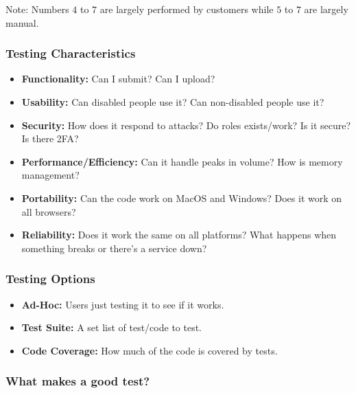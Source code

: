 \begin{note}
	Note: Numbers \(4\) to \(7\) are largely performed by customers while \(5\) to \(7\) are largely manual.
\end{note}

\subsubsection{Testing Characteristics}\label{ssub:testing_characteristics}

\begin{itemize}
	\item \textbf{Functionality:} Can I submit? Can I upload?
	\item \textbf{Usability:} Can disabled people use it? Can non-disabled people use it?
	\item \textbf{Security:} How does it respond to attacks? Do roles exists/work? Is it secure? Is there 2FA?
	\item \textbf{Performance/Efficiency:} Can it handle peaks in volume? How is memory management?
	\item \textbf{Portability:} Can the code work on MacOS and Windows? Does it work on all browsers?
	\item \textbf{Reliability:} Does it work the same on all platforms? What happens when something breaks or there's a service down?
\end{itemize}

\subsubsection{Testing Options}\label{ssub:testing_options}

\begin{itemize}
	\item \textbf{Ad-Hoc:} Users just testing it to see if it works.
	\item \textbf{Test Suite:} A set list of test/code to test.
	\item \textbf{Code Coverage:} How much of the code is covered by tests.
\end{itemize}

\subsubsection{What makes a good test?}\label{ssub:what_makes_a_good_test_}

